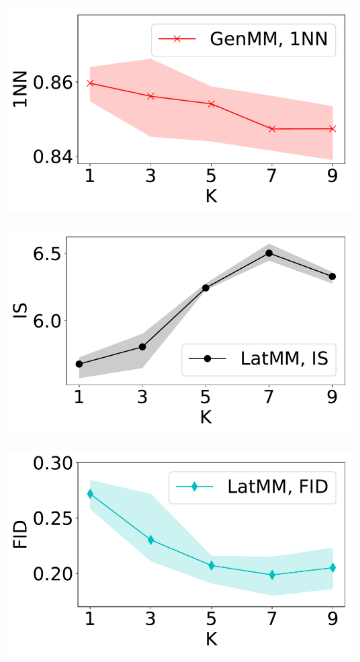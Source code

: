 \begin{figure}[!tp]
\begin{subfigure}{.24\textwidth}
  \end{subfigure}
  \centering
  \begin{subfigure}{0.24\textwidth}
    \centering
    \includegraphics[width=1\linewidth]{images/fashion-mnist/scores/std1EMGM-NM/EMGM-NM-1NN-K.pdf}
  \end{subfigure}
  \centering
  \begin{subfigure}{.24\textwidth}
    \centering
    \includegraphics[width=1\linewidth]{images/fashion-mnist/scores/std1EMGM-SM/EMGM-SM-IS-K.pdf}
  \end{subfigure}
  \centering
  \begin{subfigure}{.24\textwidth}
    \centering
    \includegraphics[width=1\linewidth]{images/fashion-mnist/scores/std1EMGM-SM/EMGM-SM-FID-K.pdf}

\end{subfigure}
\end{figure}
